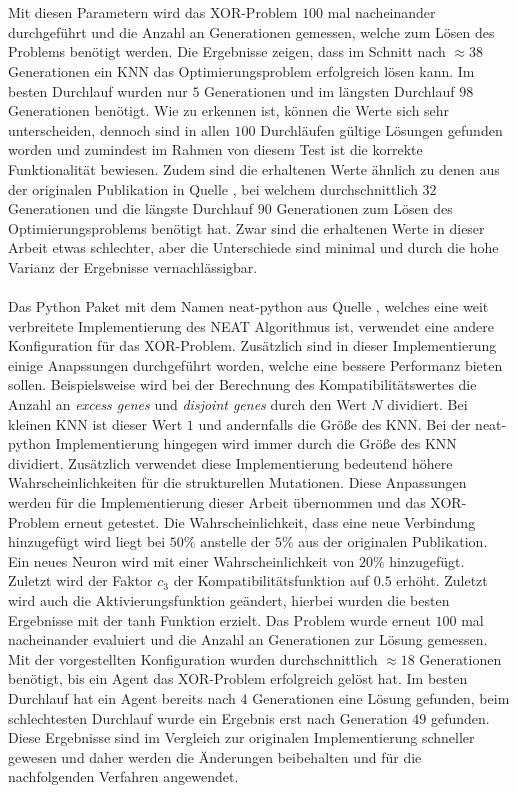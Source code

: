 \\\\
Mit diesen Parametern wird das XOR-Problem $100$ mal nacheinander durchgeführt und die Anzahl an Generationen gemessen, welche zum Lösen des Problems benötigt werden. Die Ergebnisse zeigen, dass im Schnitt nach $\approx 38$ Generationen ein \ac{KNN} das Optimierungsproblem erfolgreich lösen kann. Im besten Durchlauf wurden nur $5$ Generationen und im längsten Durchlauf $98$ Generationen benötigt. Wie zu erkennen ist, können die Werte sich sehr unterscheiden, dennoch sind in allen $100$ Durchläufen gültige Lösungen gefunden worden und zumindest im Rahmen von diesem Test ist die korrekte Funktionalität bewiesen. Zudem sind die erhaltenen Werte ähnlich zu denen aus der originalen Publikation in Quelle \cite{stanley2002evolving}, bei welchem durchschnittlich $32$ Generationen und die längste Durchlauf $90$ Generationen zum Lösen des Optimierungsproblems benötigt hat. Zwar sind die erhaltenen Werte in dieser Arbeit etwas schlechter, aber die Unterschiede sind minimal und durch die hohe Varianz der Ergebnisse vernachlässigbar.
\\\\
Das Python Paket mit dem Namen neat-python aus Quelle \cite{mcintyre_neatpython}, welches eine weit verbreitete Implementierung des \ac{NEAT} Algorithmus ist, verwendet eine andere Konfiguration für das XOR-Problem. Zusätzlich sind in dieser Implementierung einige Anapssungen durchgeführt worden, welche eine bessere Performanz bieten sollen. Beispielsweise wird bei der Berechnung des Kompatibilitätswertes die Anzahl an \emph{excess genes} und \emph{disjoint genes} durch den Wert $N$ dividiert. Bei kleinen \ac{KNN} ist dieser Wert $1$ und andernfalls die Größe des \ac{KNN}. Bei der neat-python Implementierung hingegen wird immer durch die Größe des \ac{KNN} dividiert. Zusätzlich verwendet diese Implementierung bedeutend höhere Wahrscheinlichkeiten für die strukturellen Mutationen. Diese Anpassungen werden für die Implementierung dieser Arbeit übernommen und das XOR-Problem erneut getestet. Die Wahrscheinlichkeit, dass eine neue Verbindung hinzugefügt wird liegt bei $50\%$ anstelle der $5\%$ aus der originalen Publikation. Ein neues Neuron wird mit einer Wahrscheinlichkeit von $20\%$ hinzugefügt. Zuletzt wird der Faktor $c_3$ der Kompatibilitätsfunktion auf $0.5$ erhöht. Zuletzt wird auch die Aktivierungsfunktion geändert, hierbei wurden die besten Ergebnisse mit der \ac{tanh} Funktion erzielt. Das Problem wurde erneut $100$ mal nacheinander evaluiert und die Anzahl an Generationen zur Lösung gemessen. Mit der vorgestellten Konfiguration wurden durchschnittlich $\approx 18$ Generationen benötigt, bis ein Agent das XOR-Problem erfolgreich gelöst hat. Im besten Durchlauf hat ein Agent bereits nach $4$ Generationen eine Lösung gefunden, beim schlechtesten Durchlauf wurde ein Ergebnis erst nach Generation $49$ gefunden. Diese Ergebnisse sind im Vergleich zur originalen Implementierung schneller gewesen und daher werden die Änderungen beibehalten und für die nachfolgenden Verfahren angewendet.
